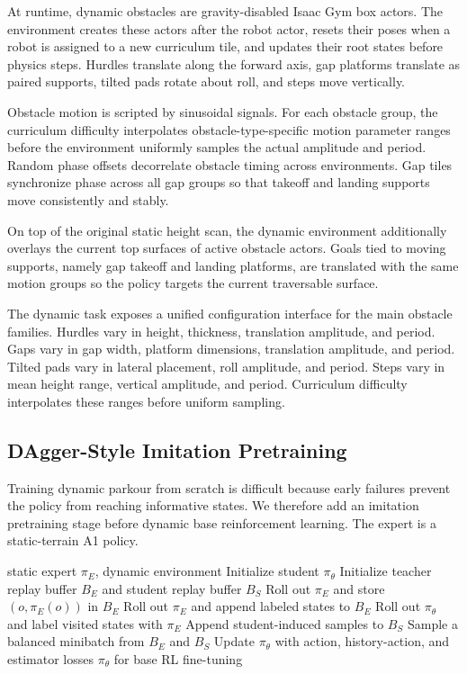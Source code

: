 \documentclass[conference]{IEEEtran}
\begin{document}
At runtime, dynamic obstacles are gravity-disabled Isaac Gym box actors. The environment creates these actors after the robot actor, resets their poses when a robot is assigned to a new curriculum tile, and updates their root states before physics steps. Hurdles translate along the forward axis, gap platforms translate as paired supports, tilted pads rotate about roll, and steps move vertically.

Obstacle motion is scripted by sinusoidal signals. For each obstacle group, the curriculum difficulty interpolates obstacle-type-specific motion parameter ranges before the environment uniformly samples the actual amplitude and period. Random phase offsets decorrelate obstacle timing across environments. Gap tiles synchronize phase across all gap groups so that takeoff and landing supports move consistently and stably.

On top of the original static height scan, the dynamic environment additionally overlays the current top surfaces of active obstacle actors. Goals tied to moving supports, namely gap takeoff and landing platforms, are translated with the same motion groups so the policy targets the current traversable surface.

The dynamic task exposes a unified configuration interface for the main obstacle families. Hurdles vary in height, thickness, translation amplitude, and period. Gaps vary in gap width, platform dimensions, translation amplitude, and period. Tilted pads vary in lateral placement, roll amplitude, and period. Steps vary in mean height range, vertical amplitude, and period. Curriculum difficulty interpolates these ranges before uniform sampling.

\subsection{DAgger-Style Imitation Pretraining}
Training dynamic parkour from scratch is difficult because early failures prevent the policy from reaching informative states. We therefore add an imitation pretraining stage before dynamic base reinforcement learning. The expert is a static-terrain A1 policy.

\begin{algorithm}[htb]
	\small
	\caption{DAgger-style imitation pretraining}
	\label{alg:dagger}
	\begin{algorithmic}[1]
		\Require static expert \(\pi_E\), dynamic environment
		\State Initialize student \(\pi_\theta\)
		\State Initialize teacher replay buffer \(B_E\) and student replay buffer \(B_S\)
		\State Roll out \(\pi_E\) and store \((o,\pi_E(o))\) in \(B_E\)
		\Else
		\State Roll out \(\pi_E\) and append labeled states to \(B_E\)
		\State Roll out \(\pi_\theta\) and label visited states with \(\pi_E\)
		\State Append student-induced samples to \(B_S\)
		\EndIf
		\State Sample a balanced minibatch from \(B_E\) and \(B_S\)
		\State Update \(\pi_\theta\) with action, history-action, and estimator losses
		\EndFor
		\State \Return \(\pi_\theta\) for base RL fine-tuning
	\end{algorithmic}
\end{algorithm}
\end{document}
